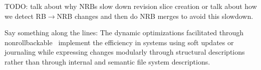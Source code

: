 TODO: talk about why NRBs slow down revision slice creation or talk
about how we detect RB$\rightarrow$NRB changes and then do NRB merges
to avoid this slowdown.

Say something along the lines:
%
The dynamic optimizations facilitated through nonrollbackable
\chdescs\ implement the efficiency in systems using soft updates or
journaling while expressing
changes modularly through structural descriptions rather than through
internal and semantic file system descriptions.






